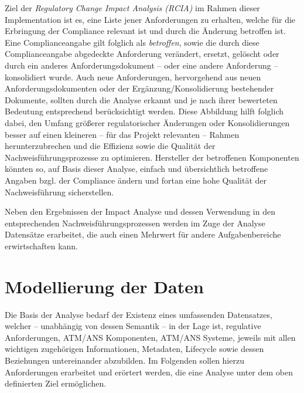 Ziel der \textit{Regulatory Change Impact Analysis (RCIA)} im Rahmen dieser Implementation ist es, eine Liste jener Anforderungen zu erhalten, welche für die Erbringung der Compliance relevant ist und durch die Änderung betroffen ist. 
Eine Complianceangabe gilt folglich als \textit{betroffen}, sowie die durch diese Complianceangabe abgedeckte Anforderung verändert, ersetzt, gelöscht oder durch ein anderes Anforderungsdokument -- oder eine andere Anforderung -- konsolidiert wurde.
Auch neue Anforderungen, hervorgehend aus neuen Anforderungsdokumenten oder der Ergänzung/Konsolidierung bestehender Dokumente, sollten durch die Analyse erkannt und je nach ihrer bewerteten Bedeutung entsprechend berücksichtigt werden.   
Diese Abbildung hilft folglich dabei, den Umfang größerer regulatorischer Änderungen oder Konsolidierungen besser auf einen kleineren -- für das Projekt relevanten -- Rahmen herunterzubrechen und die Effizienz sowie die Qualität der Nachweisführungsprozesse zu optimieren. 
Hersteller der betroffenen Komponenten könnten so, auf Basis dieser Analyse, einfach und übersichtlich betroffene Angaben bzgl. der Compliance ändern und fortan eine hohe Qualität der Nachweisführung sicherstellen.

Neben den Ergebnissen der Impact Analyse und dessen Verwendung in den entsprechenden Nachweisführungsprozessen werden im Zuge der Analyse Datensätze erarbeitet, die auch einen Mehrwert für andere Aufgabenbereiche erwirtschaften kann. 




\pagebreak

    
\section{Modellierung der Daten} 

Die Basis der Analyse bedarf der Existenz eines umfassenden Datensatzes, welcher -- unabhängig von dessen Semantik -- in der Lage ist, regulative Anforderungen, ATM/ANS Komponenten, ATM/ANS Systeme, jeweils mit allen wichtigen zugehörigen Informationen, Metadaten, Lifecycle sowie dessen Beziehungen untereinander abzubilden.
Im Folgenden sollen hierzu Anforderungen erarbeitet und erörtert werden, die eine Analyse unter dem oben definierten Ziel ermöglichen.


